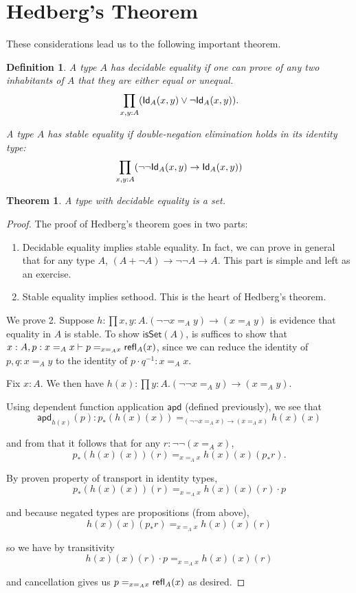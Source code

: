 \documentclass[11pt]{article}
\newcommand*{\apd}{\mathsf{apd}}
\newcommand*{\isSet}{\mathsf{isSet}}
\newtheorem{thm}{Theorem}
\newtheorem{defn}{Definition}
\begin{document}
\section{Hedberg's Theorem}
These considerations lead us to the following important theorem.

\begin{defn}
 A type $A$ has \emph{decidable equality} if one can prove of any two inhabitants of $A$ 
 that they are either equal or unequal.
 $$\prod_{x,y:A}(\mathsf{Id}_{A}(x,y)\vee \neg \mathsf{Id}_{A}(x,y)).$$
 
 A type $A$ has \emph{stable equality} if double-negation elimination holds in its identity type:
 $$\prod_{x,y:A}(\neg\neg \mathsf{Id}_{A}(x,y)\to \mathsf{Id}_{A}(x,y))$$
\end{defn}

\begin{thm}
 A type with decidable equality is a set.
\end{thm}
\begin{proof}
 
 The proof of Hedberg's theorem goes in two parts:
 \begin{enumerate}
  \item Decidable equality implies stable equality. In fact, we can prove in general that for 
  any type $A$, $(A+\neg A)\to \neg\neg A \to A$. This part is simple and left as an exercise.
  
  \item Stable equality implies sethood. This is the heart of Hedberg's theorem.
 \end{enumerate}
 
 We prove 2. Suppose $h:\prod x,y:A.(\neg \neg x=_A y)\to (x=_Ay)$ is evidence that equality in $A$ is stable.
 To show $\isSet(A)$, is suffices to show that $x:A, p:x=_A x\vdash p=_{x=_A x} \mathsf{refl}_{A}(x)$, 
 since we can reduce the identity of $p,q:x=_A y$ to the identity of $p\cdot q^{-1}: x=_A x$.
 
 Fix $x:A$. We then have $h(x):\prod y:A.(\neg\neg x=_A y)\to(x=_A y)$.
 
 Using dependent function application $\apd$ (defined previously), we see that
 $$\apd_{h(x)}(p): p_*(h(x)(x))=_{(\neg\neg x=_A x)\to(x=_A x)}h(x)(x)$$
 
 and from that it follows that for any $r:\neg\neg(x=_A x)$,
 $$ p_*(h(x)(x))(r)=_{x=_A x} h(x)(x)(p_* r). $$
 
 By proven property of transport in identity types,
 $$ p_*(h(x)(x))(r) =_{x=_A x} h(x)(x)(r)\cdot p $$ %
 
 and because negated types are propositions (from above),
 $$ h(x)(x)(p_* r) =_{x=_A x} h(x)(x)(r)$$
 
 so we have by transitivity
 $$ h(x)(x)(r)\cdot p =_{x=_A x} h(x)(x)(r) $$
 
 and cancellation gives us $p =_{x=_A x} \mathsf{refl}_{A}(x)$ as desired.
\end{proof}
\end{document}
